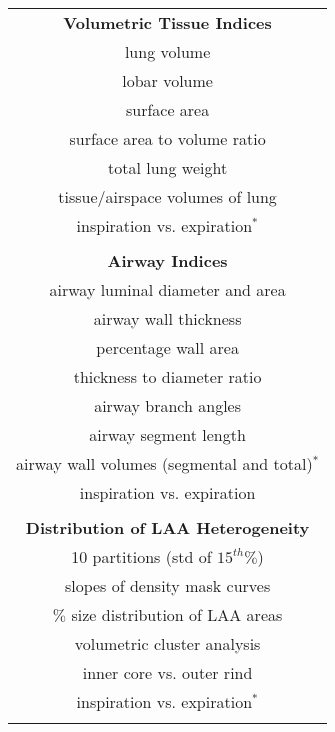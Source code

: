 
\begin{table}[!t]
  \small
  \begin{minipage}{0.33 \linewidth}
   \vspace{-2mm}
   \centering
    \begin{tabular}[t]{c}
    {\bf Volumetric Tissue Indices}  \\
    \cmidrule[1pt](lr){1-1}
    lung volume   \\
    lobar volume  \\
    surface area  \\
    surface area to volume ratio  \\
    total lung weight  \\
    tissue/airspace volumes of lung \\
    inspiration vs. expiration$^*$ \\
    \\
    {\bf Airway Indices} \\
    \cmidrule[1pt](lr){1-1}
    airway luminal diameter and area  \\
    airway wall thickness  \\
    percentage wall area   \\
    thickness to diameter ratio  \\
    airway branch angles  \\
    airway segment length  \\
    airway wall volumes (segmental and total)$^*$ \\
    inspiration vs. expiration  \\
    \\
    {\bf Distribution of LAA Heterogeneity}  \\
    \cmidrule[1pt](lr){1-1}
    10 partitions (std of $15^{th} \%$)  \\
    slopes of density mask curves  \\
    $\%$ size distribution of LAA areas \\
    volumetric cluster analysis \\
    inner core vs. outer rind \\
    inspiration vs. expiration$^*$ \\
    \\
   \end{tabular}
   \end{minipage}
  \hspace{0cm}
  \begin{minipage}{0.33 \linewidth}
   \vspace{-8mm}

\end{minipage}
\end{table}
